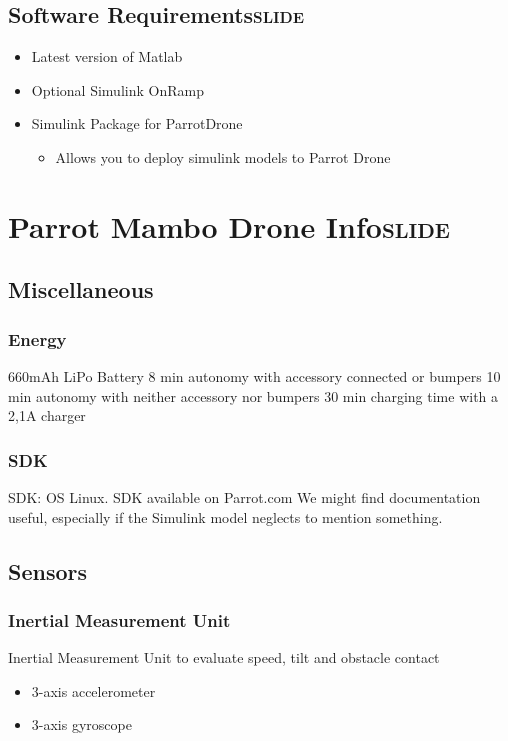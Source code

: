 \documentclass[unrestricted]{meetingnotesminutes}
\begin{document}
\subsection{Software Requirements\hfill{}\textsc{slide}}
\label{sec:orgc229d7b}
\begin{itemize}
\item Latest version of Matlab
\item Optional Simulink OnRamp
\item Simulink Package for ParrotDrone
\begin{itemize}
\item Allows you to deploy simulink models to Parrot Drone
\end{itemize}
\end{itemize}

\section{Parrot Mambo Drone Info\hfill{}\textsc{slide}}
\label{sec:org1acde02}
\subsection{Miscellaneous}
\label{sec:org4c6c360}
\subsubsection{Energy}
\label{sec:orgdccaeb3}
660mAh LiPo Battery
8 min autonomy with accessory connected or bumpers
10 min autonomy with neither accessory nor bumpers
30 min charging time with a 2,1A charger

\subsubsection{SDK}
\label{sec:org99fa7d2}
SDK: OS Linux. SDK available on Parrot.com
We might find documentation useful, especially if the Simulink model neglects to mention something.

\subsection{Sensors}
\label{sec:orgc4a1a4d}
\subsubsection{Inertial Measurement Unit}
\label{sec:orge124f81}
Inertial Measurement Unit to evaluate speed, tilt and obstacle contact
\begin{itemize}
\item 3-axis accelerometer
\item 3-axis gyroscope
\end{itemize}
\end{document}
